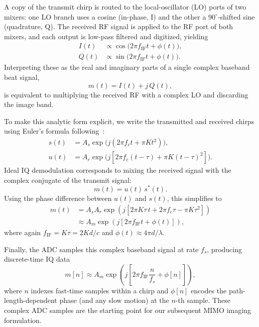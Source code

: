 A copy of the transmit chirp is routed to the local-oscillator (LO) ports of two mixers: one LO branch uses a cosine (in-phase, I) and the other a $90^\circ$-shifted sine (quadrature, Q). The received RF signal is applied to the RF port of both mixers, and each output is low-pass filtered and digitized, yielding
\begin{align}
    I(t) &\propto \cos\!\big(2\pi f_{\mathrm{IF}} t + \phi(t)\big),\\
    Q(t) &\propto \sin\!\big(2\pi f_{\mathrm{IF}} t + \phi(t)\big).
\end{align}
Interpreting these as the real and imaginary parts of a single complex baseband beat signal,
\begin{equation}
    m(t) = I(t) + j\,Q(t),
\end{equation}
is equivalent to multiplying the received RF with a complex LO and discarding the image band.

To make this analytic form explicit, we write the transmitted and received chirps using Euler’s formula following~\cite{270463}:
\begin{align}
    s(t) &= A_s \exp\!\big(j (2\pi f_c t + \pi K t^2)\big),\\
    u(t) &= A_r \exp\!\big(j [2\pi f_c (t-\tau) + \pi K (t-\tau)^2]\big).
\end{align}
Ideal IQ demodulation corresponds to mixing the received signal with the complex conjugate of the transmit signal:
\begin{equation}
    m(t) = u(t)\,s^*(t).
\end{equation}
Using the phase difference between $u(t)$ and $s(t)$, this simplifies to
\begin{align}
    m(t) 
    &= A_s A_r \exp\!\left(
        j \left[ 2\pi K \tau\, t + 2\pi f_c \tau - \pi K \tau^2 \right]
    \right) \\
    &\approx A_m \exp\!\left(
        j \left[ 2\pi f_{\mathrm{IF}} t + \phi(t) \right]
    \right),
    \label{eq:complex_baseband_continuous}
\end{align}
where again $f_{\mathrm{IF}} = K \tau = 2 K d/c$ and $\phi(t) \approx 4\pi d/\lambda$.

Finally, the ADC samples this complex baseband signal at rate $f_s$, producing discrete-time IQ data
\begin{equation}
    m[n] \approx A_m 
    \exp\!\left(
        j \left[ 2\pi f_{\mathrm{IF}} \frac{n}{f_s} + \phi[n] \right]
    \right),
    \label{eq:adc_samples}
\end{equation}
where $n$ indexes fast-time samples within a chirp and $\phi[n]$ encodes the path-length-dependent phase (and any slow motion) at the $n$-th sample. These complex ADC samples are the starting point for our subsequent MIMO imaging formulation.


